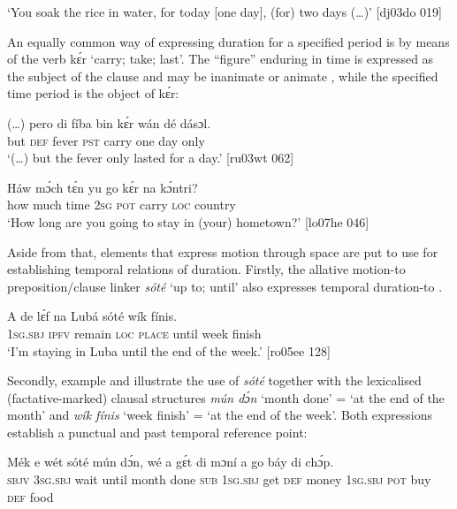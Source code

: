 \glt ‘You soak the rice in water, for today [one day], (for) two days (…)’ [dj03do 019]
\z

An equally common way of expressing duration for a specified period is by means of the verb kɛ́r ‘carry; take; last’. The “figure” enduring in time is expressed as the subject of the clause and may be inanimate  or animate , while the specified time period is the object of kɛ́r: 


\ea%
    \label{ex:key:1024}
    \gll (…)  pero  di  fíba    bin  kɛ́r    wán    dé  dásɔl.\\
{}  but    \textsc{def}  fever  \textsc{pst}  carry  one    day  only\\

\glt ‘(…) but the fever only lasted for a day.’ [ru03wt 062]
\z


\ea%
    \label{ex:key:1025}
    \gll Háw  mɔ́ch  tɛ́n    yu  go  kɛ́r    na  kɔ́ntri?\\
how    much  time    \textsc{2sg}  \textsc{pot}  carry  \textsc{loc}  country\\

\glt ‘How long are you going to stay in (your) hometown?’ [lo07he 046]
\z

Aside from that, elements that express motion through space are put to use for establishing temporal relations of duration. Firstly, the allative motion\index{}{}-to preposition/clause linker \textit{sóté} ‘up to; until’ also expresses temporal duration-to . 


\ea%
    \label{ex:key:1026}
    \gll A    de  lɛ́f    na  Lubá  sóté    wík    fínis.\\
\textsc{1sg.sbj}  \textsc{ipfv}  remain  \textsc{loc}  \textsc{place}  until  week  finish\\

\glt ‘I’m staying in Luba until the end of the week.’ [ro05ee 128]
\z

Secondly, example  and  illustrate the use of \textit{sóté} together with the lexicalised (factative-marked) clausal structures \textit{mún dɔ́n} ‘month done’ = ‘at the end of the month’ and \textit{wík fínis} ‘week finish’ = ‘at the end of the week’. Both expressions establish a punctual and past temporal reference point:


\ea%
    \label{ex:key:1027}
    \gll Mék  e    wét    sóté    mún  dɔ́n,    wé  a    gɛ́t
di  mɔní  a    go  báy  di  chɔ́p.\\
\textsc{sbjv}  \textsc{3sg.sbj}  wait    until  month  done  \textsc{sub}  \textsc{1sg.sbj}  get
\textsc{def}  money  \textsc{1sg.sbj}  \textsc{pot}  buy  \textsc{def}  food\\

